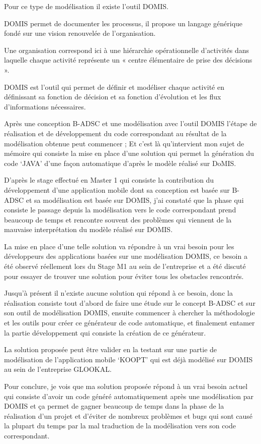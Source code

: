 \documentclass[a4paper,12pt]{article}
\begin{document}
Pour ce type de modélisation il existe l’outil DOMIS.

DOMIS permet de documenter les processus, il propose un langage générique fondé sur une vision renouvelée de l’organisation.

Une organisation correspond ici à une hiérarchie opérationnelle d’activités dans laquelle chaque activité représente un « centre élémentaire de prise des décisions ».

DOMIS est l’outil qui permet de définir et modéliser chaque activité en définissant sa fonction de décision et sa fonction d’évolution et les flux d’informations nécessaires.

\vspace{0,5cm}

Après une conception B-ADSC et une modélisation avec l’outil DOMIS l’étape de réalisation et de développement du code correspondant au résultat de la modélisation obtenue peut commencer ; Et c’est là qu’intervient mon sujet de mémoire qui consiste la mise en place d’une solution qui permet la génération du code ‘JAVA’ d’une façon automatique d’après le modèle réalisé sur DoMIS.

\vspace{0,5cm}

D’après le stage effectué en Master 1 qui consiste la contribution du développement d’une application mobile dont sa conception est basée sur B-ADSC et sa modélisation est basée sur DOMIS, j’ai constaté que la phase qui consiste le passage depuis la modélisation vers le code correspondant prend beaucoup de temps et rencontre souvent des problèmes qui viennent de la mauvaise interprétation du modèle réalisé sur DOMIS.

La mise en place d’une telle solution va répondre à un vrai besoin pour les développeurs des applications basées sur une modélisation DOMIS, ce besoin a été observé réellement lors du Stage M1 au sein de l’entreprise et a été discuté pour essayer de trouver une solution pour éviter tous les obstacles rencontrés.

\vspace{0,5cm}

Jusqu’à présent il n’existe aucune solution qui répond à ce besoin, donc la réalisation consiste tout d’abord de faire une étude sur le concept B-ADSC et sur son outil de modélisation DOMIS, ensuite commencer à chercher la méthodologie et les outils pour créer ce générateur de code automatique, et finalement entamer la partie développement qui consiste la création de ce générateur.

La solution proposée peut être valider en la testant sur une partie de modélisation de l’application mobile ‘KOOPT’ qui est déjà modélisé sur DOMIS au sein de l’entreprise GLOOKAL.

\vspace{0,5cm}

Pour conclure, je vois que ma solution proposée répond à un vrai besoin actuel qui consiste d’avoir un code généré automatiquement après une modélisation par DOMIS et ça permet de gagner beaucoup de temps dans la phase de la réalisation d’un projet et d’éviter de nombreux problèmes et bugs qui sont causé la plupart du temps par la mal traduction de la modélisation vers son code correspondant.
\end{document}
